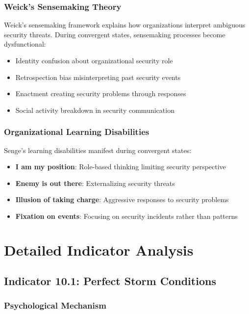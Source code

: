 \documentclass[11pt,a4paper]{article}
\begin{document}
\subsubsection{Weick's Sensemaking Theory}

Weick's\cite{weick1995} sensemaking framework explains how organizations interpret ambiguous security threats. During convergent states, sensemaking processes become dysfunctional:
\begin{itemize}
\item Identity confusion about organizational security role
\item Retrospection bias misinterpreting past security events
\item Enactment creating security problems through responses
\item Social activity breakdown in security communication
\end{itemize}

\subsubsection{Organizational Learning Disabilities}

Senge's\cite{senge1990} learning disabilities manifest during convergent states:
\begin{itemize}
\item \textbf{I am my position}: Role-based thinking limiting security perspective
\item \textbf{Enemy is out there}: Externalizing security threats
\item \textbf{Illusion of taking charge}: Aggressive responses to security problems
\item \textbf{Fixation on events}: Focusing on security incidents rather than patterns
\end{itemize}

\section{Detailed Indicator Analysis}

\subsection{Indicator 10.1: Perfect Storm Conditions}

\subsubsection{Psychological Mechanism}
\end{document}
